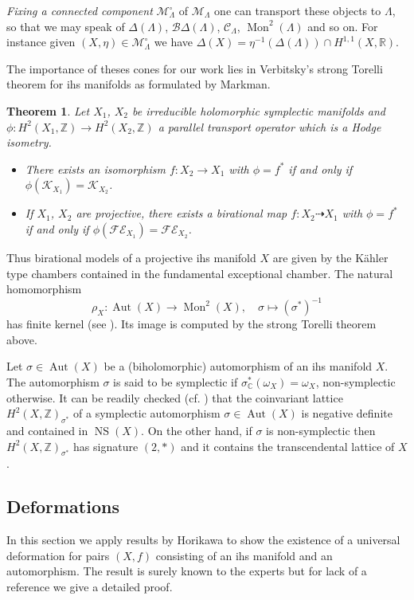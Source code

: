 \documentclass{amsart}
\theoremstyle{definition}
\theoremstyle{plain}
\newtheorem{theorem}[definition]{Theorem}
\DeclareMathOperator{\aut}{Aut}
\DeclareMathOperator{\Mo}{Mon}
\DeclareMathOperator{\ns}{NS}
\newcommand{\RR}{\mathbb{R}}
\newcommand{\CC}{\mathbb{C}}
\newcommand{\ZZ}{\mathbb{Z}}
\newcommand{\IZ}{\mathbb{Z}}
\newcommand{\K}{\mathcal{K}}
\newcommand{\M}{\mathcal{M}}
\newcommand{\C}{\mathcal{C}}
\newcommand{\B}{\mathcal{B}}
\begin{document}
\smallskip
\emph{Fixing a connected component} $\M^\circ_\Lambda$ of
$\M_\Lambda$  one can transport these objects to $\Lambda$,
so that we may speak of $\Delta(\Lambda)$, $\B\Delta(\Lambda)$, $\C_\Lambda$,
$\Mo^2(\Lambda)$ and so on. For instance given
$(X,\eta) \in \M_\Lambda^\circ$ we have
$\Delta(X) = \eta^{-1}(\Delta(\Lambda)) \cap H^{1,1}(X,\RR)$.

The importance of theses cones for our work lies in Verbitsky's strong Torelli theorem \cite{verbitsky} for ihs manifolds as formulated by Markman.
\begin{theorem}\cite[Thms.\ 1.2, 1.6, Cor.\ 5.7]{markman}\label{thm:torelli}
Let $X_1$, $X_2$ be irreducible holomorphic symplectic manifolds and $\phi\colon H^2(X_1,\ZZ) \rightarrow H^2(X_2,\ZZ)$ a parallel transport operator which is a Hodge isometry.
\begin{itemize}
 \item There exists an isomorphism $f\colon X_2 \rightarrow X_1$ with $\phi=f^\ast$ if and only if $\phi(\K_{X_1})=\K_{X_2}$.
 \item If $X_1$, $X_2$ are projective, there exists a birational map $f\colon X_2 \dashrightarrow X_1$ with $\phi=f^\ast$  if and only if $\phi(\mathcal{FE}_{X_1})=\mathcal{FE}_{X_2}$.
\end{itemize}
\end{theorem}

Thus birational models of a projective ihs manifold $X$ are given by the K\"ahler type chambers contained in the fundamental exceptional chamber.
The natural homomorphism
\[\rho_X \colon \aut(X) \rightarrow \Mo^2(X), \quad \sigma \mapsto (\sigma^*)^{-1}\]
has finite kernel (see \cite[Prop.\ 9.1]{huybr_basic}).
Its image is computed by the strong Torelli theorem above.

Let $\sigma \in \aut(X)$ be a (biholomorphic) automorphism of an ihs manifold $X$.
The automorphism $\sigma$ is said to be symplectic if $\sigma_\CC^*(\omega_X) = \omega_X$, non-symplectic otherwise. It can be readily checked (cf. \cite[\S 5]{smith})
that the coinvariant lattice $H^2(X,\IZ)_{\sigma^*}$ of a
symplectic automorphism $\sigma \in \aut(X)$ is negative
definite and contained in $\ns(X)$. On the other hand,
if $\sigma$ is non-symplectic then $H^2(X,\IZ)_{\sigma^*}$
has signature $(2,\ast)$ and it contains the transcendental
lattice of $X$.

\subsection{Deformations}\label{sect:deformation}
In this section we apply results by Horikawa to show the existence of a universal deformation for pairs $(X,f)$ consisting of an ihs manifold and an automorphism. The result is surely known to the experts but for lack of a reference we give a detailed proof.
\end{document}
